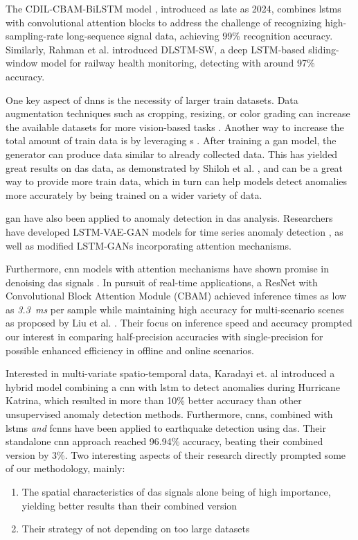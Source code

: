 The CDIL-CBAM-BiLSTM model \cite{wang2024deep}, introduced as late as 2024, combines \acrshort{lstm}s with convolutional attention blocks to address the challenge of recognizing high-sampling-rate long-sequence signal data, achieving 99\% recognition accuracy. Similarly, Rahman et al. \cite{10.1115/JRC2024-124137} introduced DLSTM-SW, a deep LSTM-based sliding-window model for railway health monitoring, detecting with around 97\% accuracy.

One key aspect of \acrshort{dnn}s is the necessity of larger train datasets. Data augmentation techniques such as cropping, resizing, or color grading can increase the available datasets for more vision-based tasks \cite{shorten2019survey}. Another way to increase the total amount of train data is by leveraging s \cite{goodfellow2014generative, goodfellow2016nips}. After training a \acrshort{gan} model, the generator can produce data similar to already collected data. This has yielded great results on \acrshort{das} data, as demonstrated by Shiloh et al. \cite{Shiloh:19}, and can be a great way to provide more train data, which in turn can help models detect anomalies more accurately by being trained on a wider variety of data.

\acrshort{gan} have also been applied to anomaly detection in \acrshort{das} analysis. Researchers have developed LSTM-VAE-GAN models for time series anomaly detection \cite{s20133738}, as well as modified LSTM-GANs incorporating attention mechanisms. 

Furthermore, \acrshort{cnn} models with attention mechanisms have shown promise in denoising \acrshort{das} signals \cite{eage:/content/journals/10.1111/1365-2478.13355}. In pursuit of real-time applications, a ResNet \cite{koonce2021resnet} with Convolutional Block Attention Module (CBAM) achieved inference times as low as \textit{\qty{3.3}{\milli\second}} per sample while maintaining high accuracy for multi-scenario scenes as proposed by Liu et al. \cite{photonics9100677}. Their focus on inference speed and accuracy prompted our interest in comparing half-precision accuracies with single-precision for possible enhanced efficiency in offline and online scenarios.

Interested in multi-variate spatio-temporal data, Karadayi et. al \cite{hybriddlspatio} introduced a hybrid model 
combining a \acrshort{cnn} with \acrshort{lstm} to detect anomalies during Hurricane Katrina, which resulted in more than 10\% better accuracy than other unsupervised anomaly detection methods. Furthermore, \acrshort{cnn}s, combined with \acrshort{lstm}s \textit{and} \acrshort{fcnn}s have been applied to earthquake detection using \acrshort{das}. Their standalone \acrshort{cnn} approach reached 96.94\% accuracy, beating their combined version by 3\%. Two interesting aspects of their research directly prompted some of our methodology, mainly:
\begin{enumerate}
    \item The spatial characteristics of \acrshort{das} signals alone being of high importance, yielding better results than their combined version
    \item Their strategy of not depending on too large datasets
\end{enumerate}
